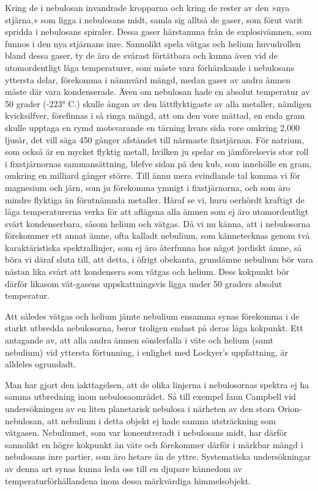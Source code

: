 \documentclass[a4paper, 12pt, oneside, swedish]{article}
\begin{document}
Kring de i nebulosan invandrade kropparna och kring de rester av den »nya stjärna,» som ligga i nebulosans midt, samla sig alltså de gaser, som förut varit spridda i nebulosans spiraler. Dessa gaser härstamma från de explosivämnen, som funnos i den nya stjärnans inre. Sannolikt spela vätgas och helium huvudrollen bland dessa gaser, ty de äro de svårast förtätbara och kunna även vid de utomordentligt låga temperaturer, som måste vara förhärskande i nebulosans yttersta delar, förekomma i nämnvärd mängd, medan gaser av andra ämnen måste där vara kondenserade. Även om nebulosan hade en absolut temperatur av 50 grader (-223° C.) skulle ångan av den lättflyktigaste av alla metaller, nämligen kvicksilfver, förefinnas i så ringa mängd, att om den vore mättad, en enda gram skulle upptaga en rymd motsvarande en tärning hvars sida vore omkring 2,000 ljusår, det vill säga 450 gånger afståndet till närmaste fixstjärnan. För natrium, som också är en mycket flyktig metall, hvilken ju spelar en jämförelsevis stor roll i fixstjärnornas sammansättning, blefve sidan på den kub, som innehölle en gram, omkring en milliard gånger större. Till ännu mera svindlande tal komma vi för magnesium och järn, som ju förekomma ymnigt i fixstjärnorna, och som äro mindre flyktiga än förutnämnda metaller. Häraf se vi, huru oerhördt kraftigt de låga temperaturerna verka för att aflägsna alla ämnen som ej äro utomordentligt svårt kondenserbara, såsom helium och vätgas. Då vi nu känna, att i nebulosorna förekommer ett annat ämne, ofta kalladt nebulium, som kännetecknas genom två karaktäristiska spektrallinjer, som ej äro återfunna hos något jordiskt ämne, så böra vi däraf sluta till, att detta, i öfrigt obekanta, grundämne nebulium bör vara nästan lika svårt att kondensera som vätgas och helium. Dess kokpunkt bör därför likasom vät-gasens uppskattningsvis ligga under 50 graders absolut temperatur.

Att således vätgas och helium jämte nebulium ensamma synas förekomma i de starkt utbredda nebulosorna, beror troligen endast på deras låga kokpunkt. Ett antagande av, att alla andra ämnen sönderfalla i väte och helium (samt nebulium) vid yttersta förtunning, i enlighet med Lockyer's uppfattning, är alldeles ogrundadt.

Man har gjort den iakttagelsen, att de olika linjerna i nebulosornas spektra ej ha samma utbredning inom nebulosaområdet. Så till exempel fann Campbell vid undersökningen av en liten planetarisk nebulosa i närheten av den stora Orion-nebulosan, att nebulium i detta objekt ej hade samma utsträckning som vätgasen. Nebuliumet, som var koncentreradt i nebulosans midt, har därför sannolikt en högre kokpunkt än väte och förekommer därför i märkbar mängd i nebulosans inre partier, som äro hetare än de yttre. Systematiska undersökningar av denna art synas kunna leda oss till en djupare kännedom av temperaturförhållandena inom dessa märkvärdiga himmelsobjekt.
\end{document}
